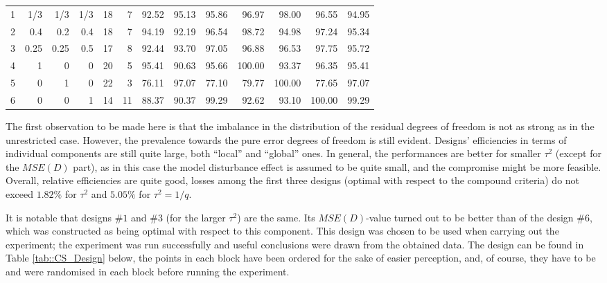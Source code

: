 \begin{table}[h]
{\begin{tabular}{rrrrrrrrrrrrc}
1 & 1/3 & 1/3 & 1/3 & \multicolumn{1}{|r}{18} & \multicolumn{1}{r|}{7} & 92.52 & 95.13 & 95.86 & \multicolumn{1}{|r}{96.97} & 98.00 & \multicolumn{1}{r|}{96.55} & 94.95 \\
2 & 0.4 & 0.2 & 0.4 & \multicolumn{1}{|r}{18} & \multicolumn{1}{r|}{7} & 94.19 & 92.19 & 96.54 & \multicolumn{1}{|r}{98.72} & 94.98 & \multicolumn{1}{r|}{97.24} & 95.34 \\
3 & 0.25 & 0.25 & 0.5 & \multicolumn{1}{|r}{17} & \multicolumn{1}{r|}{8} & 92.44 & 93.70 & 97.05 & \multicolumn{1}{|r}{96.88} & 96.53 & \multicolumn{1}{r|}{97.75} & 95.72 \\
4 & 1 & 0 & 0 & \multicolumn{1}{|r}{20} & \multicolumn{1}{r|}{5} & 95.41 & 90.63 & 95.66 & \multicolumn{1}{|r}{100.00} & 93.37 & \multicolumn{1}{r|}{96.35} & 95.41 \\
5 & 0 & 1 & 0 & \multicolumn{1}{|r}{22} & \multicolumn{1}{r|}{3} & 76.11 & 97.07 & 77.10 & \multicolumn{1}{|r}{79.77} & 100.00 & \multicolumn{1}{r|}{77.65} & 97.07 \\
6 & 0 & 0 & 1 & \multicolumn{1}{|r}{14} & \multicolumn{1}{r|}{11} & 88.37 & 90.37 & 99.29 & \multicolumn{1}{|r}{92.62} & 93.10 & \multicolumn{1}{r|}{100.00} & 99.29
\end{tabular}
}
\end{table}

The first observation to be made here is that the imbalance in the distribution of the residual degrees of freedom is not as strong as in the unrestricted case. However, the prevalence towards the pure error degrees of freedom is still evident. Designs' efficiencies in terms of individual components are still quite large, both ``local'' and ``global'' ones. In general, the performances are better for smaller $\tau^2$ (except for the $MSE(D)$ part), as in this case the model disturbance effect is assumed to be quite small, and the compromise might be more feasible. Overall, relative efficiencies are quite good, losses among the first three designs (optimal with respect to the compound criteria) do not exceed $1.82\%$ for $\tau^2$ and $5.05\%$ for $\tau^2=1/q$.

It is notable that designs \#$1$ and \#$3$ (for the larger $\tau^2$) are the same. Its $MSE(D)$-value turned out to be better than of the design \#$6$, which was constructed as being optimal with respect to this component. This design was chosen to be used when carrying out the experiment; the experiment was run successfully and useful conclusions were drawn from the obtained data. The design can be found in Table \ref{tab::CS_Design} below, the points in each block have been ordered for the sake of easier perception, and, of course, they have to be and were randomised in each block before running the experiment.

